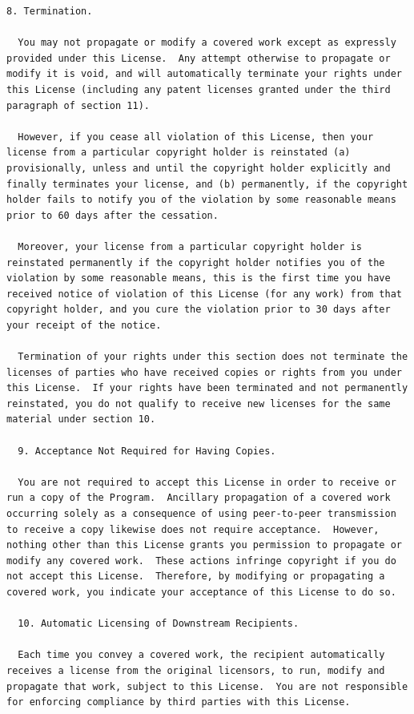 \documentclass[letterpaper,10pt,english]{sphinxmanual}
\begin{document}
\begin{Verbatim}[commandchars=\\\{\}]
  8. Termination.

  You may not propagate or modify a covered work except as expressly
provided under this License.  Any attempt otherwise to propagate or
modify it is void, and will automatically terminate your rights under
this License (including any patent licenses granted under the third
paragraph of section 11).

  However, if you cease all violation of this License, then your
license from a particular copyright holder is reinstated (a)
provisionally, unless and until the copyright holder explicitly and
finally terminates your license, and (b) permanently, if the copyright
holder fails to notify you of the violation by some reasonable means
prior to 60 days after the cessation.

  Moreover, your license from a particular copyright holder is
reinstated permanently if the copyright holder notifies you of the
violation by some reasonable means, this is the first time you have
received notice of violation of this License (for any work) from that
copyright holder, and you cure the violation prior to 30 days after
your receipt of the notice.

  Termination of your rights under this section does not terminate the
licenses of parties who have received copies or rights from you under
this License.  If your rights have been terminated and not permanently
reinstated, you do not qualify to receive new licenses for the same
material under section 10.

  9. Acceptance Not Required for Having Copies.

  You are not required to accept this License in order to receive or
run a copy of the Program.  Ancillary propagation of a covered work
occurring solely as a consequence of using peer-to-peer transmission
to receive a copy likewise does not require acceptance.  However,
nothing other than this License grants you permission to propagate or
modify any covered work.  These actions infringe copyright if you do
not accept this License.  Therefore, by modifying or propagating a
covered work, you indicate your acceptance of this License to do so.

  10. Automatic Licensing of Downstream Recipients.

  Each time you convey a covered work, the recipient automatically
receives a license from the original licensors, to run, modify and
propagate that work, subject to this License.  You are not responsible
for enforcing compliance by third parties with this License.


\end{Verbatim}
\end{document}
